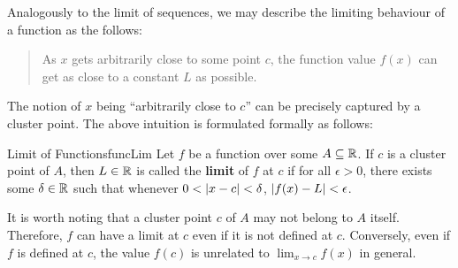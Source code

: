 \documentclass[math]{amznotes}
\theoremstyle{remark}
\begin{document}
Analogously to the limit of sequences, we may describe the limiting behaviour of a function as the follows:
\begin{quote}
    As $x$ gets arbitrarily close to some point $c$, the function value $f(x)$ can get as close to a constant $L$ as possible.
\end{quote}
The notion of $x$ being ``arbitrarily close to $c$'' can be precisely captured by a cluster point. The above intuition is formulated formally as follows:
\begin{dfnbox}{Limit of Functions}{funcLim}
    Let $f$ be a function over some $A \subseteq \mathbb{R}$. If $c$ is a cluster point of $A$, then $L \in \mathbb{R}$ is called the {\color{red} \textbf{limit}} of $f$ at $c$ if for all $\epsilon > 0$, there exists some $\delta \in \mathbb{R}$ such that whenever $0 < {\left\lvert {x - c} \right\rvert} < \delta$, ${\left\lvert {f(x) - L} \right\rvert} < \epsilon$. 
\end{dfnbox}
It is worth noting that a cluster point $c$ of $A$ may not belong to $A$ itself. Therefore, $f$ can have a limit at $c$ even if it is not defined at $c$. Conversely, even if $f$ is defined at $c$, the value $f(c)$ is unrelated to $\lim_{x \to c}f(x)$ in general.
\end{document}
